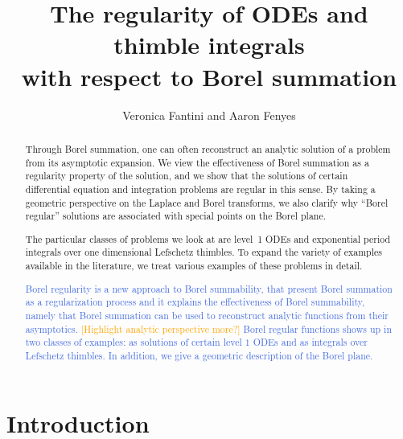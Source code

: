 \documentclass{article}
\title{The regularity of ODEs and thimble integrals \\
with respect to Borel summation}
\author{Veronica Fantini and Aaron Fenyes}
\theoremstyle{definition}
\theoremstyle{plain}
\begin{document}
\maketitle

\begin{abstract}
Through Borel summation, one can often reconstruct an analytic solution of a problem from its asymptotic expansion.
We view the effectiveness of Borel summation as a regularity property of the solution, and we show that the solutions of certain differential equation and integration problems are regular in this sense. By taking a geometric perspective on the Laplace and Borel transforms, we also clarify why ``Borel regular'' solutions are associated with special points on the Borel plane.

The particular classes of problems we look at are level~1 ODEs and exponential period integrals over one dimensional Lefschetz thimbles. To expand the variety of examples available in the literature, we treat various examples of these problems in detail.

\textcolor{RoyalBlue}{
Borel regularity is a new approach to Borel summability, that present Borel summation as a regularization process and it explains the effectiveness of Borel summability, namely that Borel summation can be used to reconstruct analytic functions from their asymptotics. \textcolor{orange}{[Highlight analytic perspective more?]} Borel regular functions shows up in two classes of examples: as solutions of certain level $1$ ODEs and as integrals over Lefschetz thimbles. In addition, we give a geometric description of the Borel plane.}
\end{abstract}
\tableofcontents
%
%
%
\section{Introduction}
\end{document}
